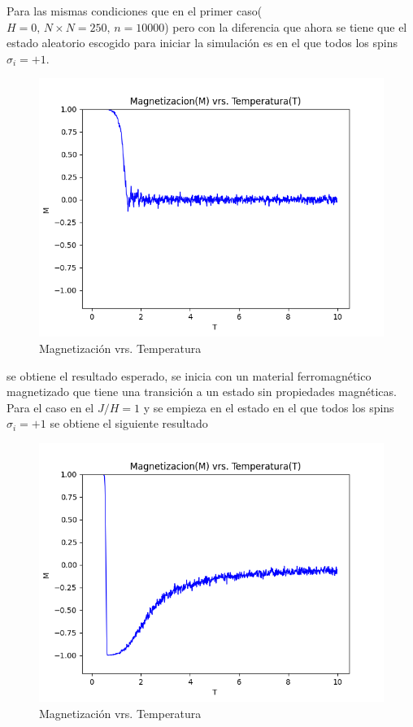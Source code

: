 \documentclass[a4paper]{article}
\begin{document}
Para las mismas condiciones que en el primer caso($H=0 ,\, N\times N=250,\, n=10000 $) pero con la diferencia que ahora se tiene que el estado aleatorio escogido para iniciar la simulación es en el que todos los spins $\sigma_i=+1$. 
\begin{figure}[H]
\begin{center}
\includegraphics[scale=0.6]{PlotMvT_sim2.png} 
\end{center} 
\caption{Magnetización vrs. Temperatura}
\end{figure}
se obtiene el resultado esperado, se inicia con un material ferromagnético magnetizado que tiene una transición a un estado sin propiedades magnéticas.\\
Para el caso en el $J/H=1$ y se empieza en el estado en el que todos los spins $\sigma_i=+1$ se obtiene el siguiente resultado
\begin{figure}[H]
\begin{center}
\includegraphics[scale=0.6]{PlotMvT_sim3.png} 
\end{center} 
\caption{Magnetización vrs. Temperatura}
\end{figure}
\end{document}
